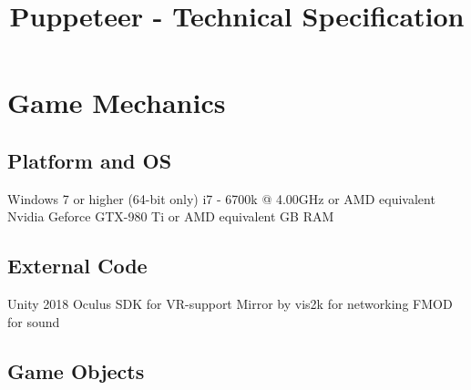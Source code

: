 \documentclass[11pt]{article}
\title{Puppeteer - Technical Specification}
\begin{document}
\maketitle


\newpage
\tableofcontents

\newpage
\section{Game Mechanics}
\subsection{Platform and OS}
Windows 7 or higher (64-bit only)
\newline i7 - 6700k @ 4.00GHz or AMD equivalent
\newline Nvidia Geforce GTX-980 Ti or AMD equivalent
 GB RAM

\subsection{External Code}
Unity 2018
\newline Oculus SDK for VR-support
\newline Mirror by vis2k for networking
\newline FMOD for sound

\subsection{Game Objects}
\end{document}
